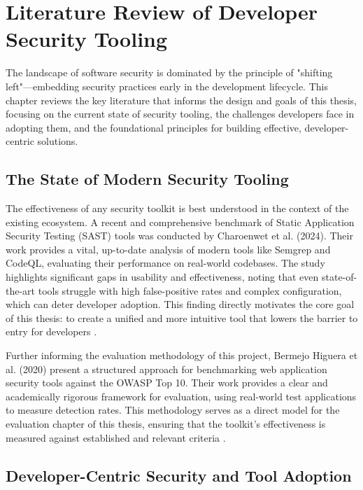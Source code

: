 \chapter{Literature Review of Developer Security Tooling}
\label{chap:litreview}
\setlength{\parskip}{1em}

The landscape of software security is dominated by the principle of "shifting left"—embedding security practices early in the development lifecycle. This chapter reviews the key literature that informs the design and goals of this thesis, focusing on the current state of security tooling, the challenges developers face in adopting them, and the foundational principles for building effective, developer-centric solutions.

\section{The State of Modern Security Tooling}

The effectiveness of any security toolkit is best understood in the context of the existing ecosystem. A recent and comprehensive benchmark of Static Application Security Testing (SAST) tools was conducted by Charoenwet et al. (2024). Their work provides a vital, up-to-date analysis of modern tools like Semgrep and CodeQL, evaluating their performance on real-world codebases. The study highlights significant gaps in usability and effectiveness, noting that even state-of-the-art tools struggle with high false-positive rates and complex configuration, which can deter developer adoption. This finding directly motivates the core goal of this thesis: to create a unified and more intuitive tool that lowers the barrier to entry for developers \cite{charoenwet2024empirical}.

Further informing the evaluation methodology of this project, Bermejo Higuera et al. (2020) present a structured approach for benchmarking web application security tools against the OWASP Top 10. Their work provides a clear and academically rigorous framework for evaluation, using real-world test applications to measure detection rates. This methodology serves as a direct model for the evaluation chapter of this thesis, ensuring that the toolkit's effectiveness is measured against established and relevant criteria \cite{bermejo2020benchmarking}.

\section{Developer-Centric Security and Tool Adoption}

